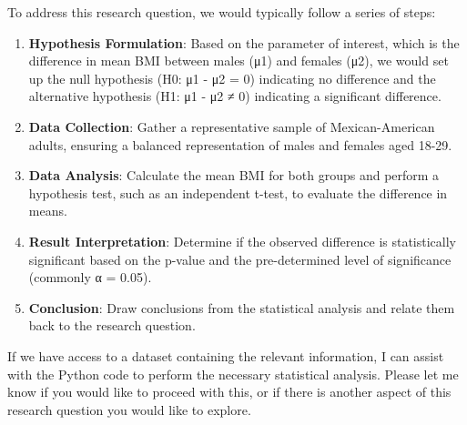 \documentclass[
  letterpaper,
  DIV=11,
  numbers=noendperiod]{scrartcl}
\begin{document}
To address this research question, we would typically follow a series of
steps:

\begin{enumerate}
\def\labelenumi{\arabic{enumi}.}
\item
  \textbf{Hypothesis Formulation}: Based on the parameter of interest,
  which is the difference in mean BMI between males (μ1) and females
  (μ2), we would set up the null hypothesis (H0: μ1 - μ2 = 0) indicating
  no difference and the alternative hypothesis (H1: μ1 - μ2 ≠ 0)
  indicating a significant difference.
\item
  \textbf{Data Collection}: Gather a representative sample of
  Mexican-American adults, ensuring a balanced representation of males
  and females aged 18-29.
\item
  \textbf{Data Analysis}: Calculate the mean BMI for both groups and
  perform a hypothesis test, such as an independent t-test, to evaluate
  the difference in means.
\item
  \textbf{Result Interpretation}: Determine if the observed difference
  is statistically significant based on the p-value and the
  pre-determined level of significance (commonly α = 0.05).
\item
  \textbf{Conclusion}: Draw conclusions from the statistical analysis
  and relate them back to the research question.
\end{enumerate}

If we have access to a dataset containing the relevant information, I
can assist with the Python code to perform the necessary statistical
analysis. Please let me know if you would like to proceed with this, or
if there is another aspect of this research question you would like to
explore.
\end{document}

